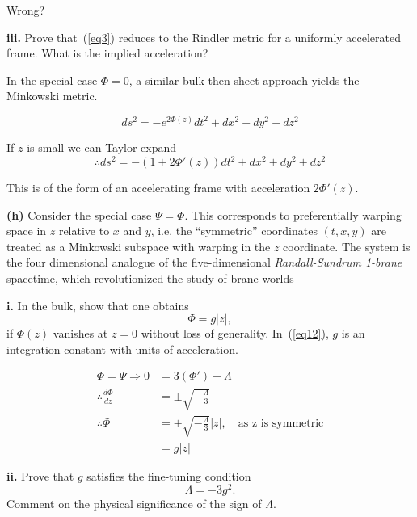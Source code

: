 \documentclass[a4paper]{article} %
\begin{document}
{\huge Wrong?}

\begin{framed}
\textbf{iii.} Prove that~(\ref{eq3}) reduces to the Rindler metric for a uniformly accelerated frame.
What is the implied acceleration?

In the special case $\Phi = 0$, a similar bulk-then-sheet approach yields the Minkowski
metric.
\end{framed}

\begin{equation}
ds^2=-e^{2\Phi(z)}dt^2 + dx^2 + dy^2 + dz^2
\end{equation}

If $z$ is small we can Taylor expand
\begin{equation}
\therefore ds^2 = -\left(1+2\Phi'(z)\right)dt^2 + dx^2 + dy^2 + dz^2
\end{equation}

This is of the form of an accelerating frame with acceleration $2\Phi'(z)$.

\begin{framed}
\textbf{(h)} Consider the special case $\Psi=\Phi$. This corresponds to preferentially warping space in $z$ relative to $x$ and $y$, i.e. the ``symmetric'' coordinates $(t, x, y)$ are treated as a Minkowski subspace with warping in the $z$ coordinate. The system is the four dimensional analogue of the five-dimensional \emph{Randall-Sundrum 1-brane} spacetime, which revolutionized the study of brane worlds 
\end{framed}


\begin{framed}
\textbf{i.} In the bulk, show that one obtains
\begin{equation}
\Phi=g |z|,\label{eq12}
\end{equation}
if $\Phi(z)$ vanishes at $z = 0$ without loss of generality. In~(\ref{eq12}), $g$ is an integration
constant with units of acceleration.
\end{framed}


\begin{align}
\Phi = \Psi \Rightarrow 0 &= 3(\Phi') + \Lambda\\
\therefore \frac{d\Phi}{dz}&= \pm \sqrt{-\frac{\Lambda}{3}}\\
\therefore \Phi &= \pm \sqrt{-\frac{\Lambda}{3}}|z|,\quad\text{as z is symmetric}\\
&=g|z|
\end{align}


\begin{framed}
\textbf{ii.} Prove that $g$ satisfies the fine-tuning condition
\begin{equation}
\Lambda=-3g^2.\label{eq13}
\end{equation}
Comment on the physical significance of the sign of $\Lambda$.
\end{framed}
\end{document}
